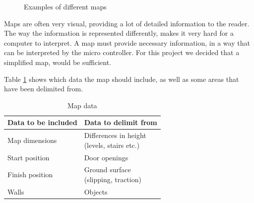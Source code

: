 \begin{figure}[h!tp]
    \centering
    \hspace{0.1\textwidth}
    \caption{Examples of different maps}
    \label{fig:floor_plans}
\end{figure}

Maps are often very visual, providing a lot of detailed information to the reader.
The way the information is represented differently,
makes it very hard for a computer to interpret.
A map must provide necessary information,
in a way that can be interpreted by the micro controller.
For this project we decided that a simplified map, would be sufficient.

Table \ref{table:map_data} shows which data the map should include,
as well as some areas that have been delimited from.

\begin{table}[h!]
	\centering
	\caption{Map data}
	\begin{tabular}{|p{}|p{}|}
		\hline
		Data to be included & Data to delimit from \\ 
		\hline
		Map dimensions 		& \parbox[t]{0.4\textwidth}{Differences in height\\(levels, stairs etc.)}\\
		\hline
		Start position 		& Door openings \\
		\hline
		Finish position 	& \parbox[t]{0.4\textwidth}{Ground surface\\(slipping, traction)} \\
		\hline
		Walls 				& Objects\\
		\hline
	\end{tabular}
	\label{table:map_data}
\end{table}

